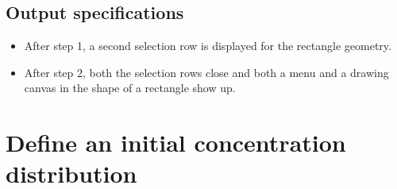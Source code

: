 \subsection*{Output specifications}
\begin{itemize}
\item After step 1, a second selection row is displayed for the rectangle geometry.
\item After step 2, both the selection rows close and both a menu and a drawing canvas in the shape of a rectangle show up.
\end{itemize}
 
\section{Define an initial concentration distribution}

